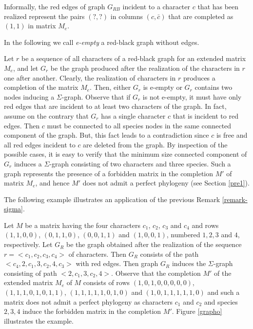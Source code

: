 \documentclass{llncs}
\newcommand{\grb}{$G_{RB}$ }
\begin{document}
Informally, the red edges of graph \grb  incident to a character $c$ that has been realized  represent  the  pairs  $(?,?)$ in columns  $(c, \bar{c})$   that are completed as $(1,1)$ in matrix $M_e$. 

In the following we call  {\em e-empty} a red-black graph without edges.

\begin{remark}
\label{remark-sigma}

Let $r$ be a sequence of  all characters of a red-black graph for an extended matrix $M_e$, and let  $G_r$  be the graph produced after the realization of the characters in $r$ one after another.  Clearly,  the realization of characters in $r$ produces a completion of the matrix $M_e$.  Then, either $G_r$ is e-empty or $G_r$ contains two nodes inducing a   $\Sigma$-graph. Observe that if  $G_r$ is not e-empty, it must have only red edges  that are  incident to at least two characters of the graph.   In fact,  assume on  the contrary that $G_r$ has a single character  $c$ that  is incident to red edges. Then $c$ must be connected  to all species nodes in the same connected component of the graph. But, this fact leads to a contradiction  since  $c$ is free and all red edges incident to $c$ are deleted from the graph. By  inspection of the possible cases, it is easy to verify that the   minimum size connected component of $G_r$ induces a $\Sigma$-graph consisting of two characters and three species. 
 Such a graph represents the presence of a  forbidden matrix in the  completion $M'$ of matrix $M_e$,  and  hence $M'$ does not admit a  perfect phylogeny (see Section \ref{pre1}). 


\end{remark}

The following example illustrates an application of the previous Remark \ref{remark-sigma}.


\begin{example}
\label{exx}
Let  $M$ be  a matrix  having the four characters $c_1$, $c_2$, $c_3$ and $c_4$ and rows $(1, 1, 0,0) $, $ (0, 1, 1, 0)$, $(0,0,1,1)$ and $(1,0,0,1)$, numbered $1, 2, 3$ and $4$, respectively.   Let $G_R$  be the graph obtained after the realization of the sequence $r=<c_1, c_2, c_3, c_4>$  of characters.  Then $G_R$ consists  of  the path $<c_4, 2,c_1,3,c_2,4,c_3>$ with red edges. Then graph $G_R$ induces the $\Sigma$-graph consisting of path  $<2,c_1,3,c_2,4>$.   Observe that the completion $M'$ of  the extended matrix $M_e$ of $M$ consists of rows $(1,0, 1,0, 0,0,0,0)$, $(1,1,1,0,1,0, 1,1)$,  $(1,1,1,1,1,0, 1,0)$ and $(1,0,1,1,1,1, 1,0)$ and such a matrix does not admit a perfect phylogeny as characters $c_1$ and $c_2$ and species $2,3,4$ induce the forbidden matrix in the completion $M'$.
Figure \ref{grapho} illustrates the example.
\end{example}
\end{document}
